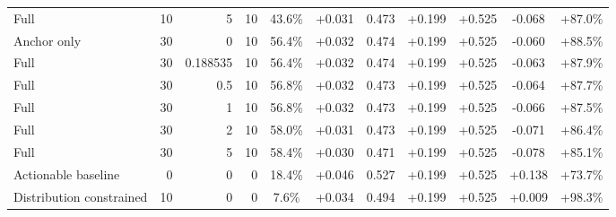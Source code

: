 \begin{table}[htbp]
\begin{tabular}{lrrrccccccc}
Full & 10 & 5 & 10 & 43.6\% & +0.031 & 0.473 & +0.199 & +0.525 & -0.068 & +87.0\% \\
Anchor only & 30 & 0 & 10 & 56.4\% & +0.032 & 0.474 & +0.199 & +0.525 & -0.060 & +88.5\% \\
Full & 30 & 0.188535 & 10 & 56.4\% & +0.032 & 0.474 & +0.199 & +0.525 & -0.063 & +87.9\% \\
Full & 30 & 0.5 & 10 & 56.8\% & +0.032 & 0.473 & +0.199 & +0.525 & -0.064 & +87.7\% \\
Full & 30 & 1 & 10 & 56.8\% & +0.032 & 0.473 & +0.199 & +0.525 & -0.066 & +87.5\% \\
Full & 30 & 2 & 10 & 58.0\% & +0.031 & 0.473 & +0.199 & +0.525 & -0.071 & +86.4\% \\
Full & 30 & 5 & 10 & 58.4\% & +0.030 & 0.471 & +0.199 & +0.525 & -0.078 & +85.1\% \\
Actionable baseline & 0 & 0 & 0 & 18.4\% & +0.046 & 0.527 & +0.199 & +0.525 & +0.138 & +73.7\% \\
Distribution constrained & 10 & 0 & 0 & 7.6\% & +0.034 & 0.494 & +0.199 & +0.525 & +0.009 & +98.3\% \\
\bottomrule
\end{tabular}
\end{table}